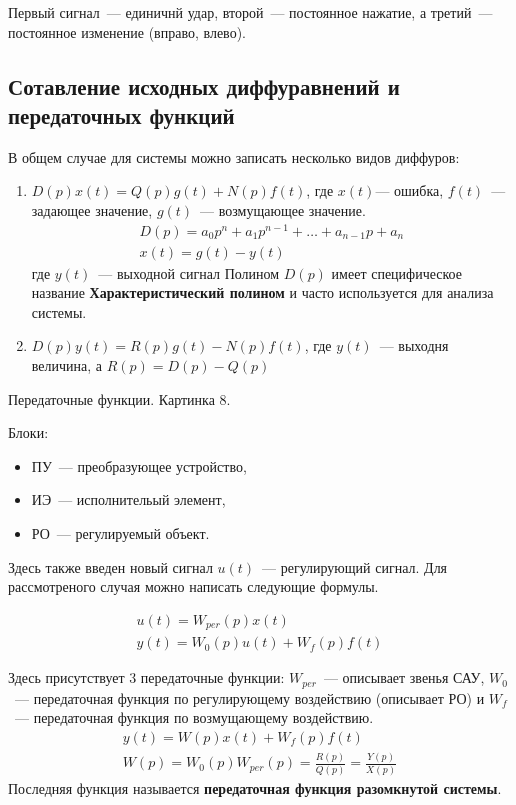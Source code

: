 Первый сигнал~--- единичнй удар, второй~--- постоянное нажатие, а третий~--- постоянное изменение (вправо, влево).

\subsection{Сотавление исходных диффуравнений и передаточных функций}
В общем случае для системы можно записать несколько видов диффуров:
\begin{enumerate}
	\item $D(p)x(t)=Q(p)g(t)+N(p)f(t)$, где $x(t)$--- ошибка, $f(t)$~--- задающее значение, $g(t)$~--- возмущающее значение.
	\begin{gather*}
		D(p)=a_0p^n+a_1p^{n-1}+\ldots+a_{n-1}p+a_n\\
		x(t)=g(t)-y(t)
	\end{gather*}
	где $y(t)$~--- выходной сигнал
	Полином $D(p)$ имеет специфическое название \textbf{Характеристический полином} и часто используется для анализа системы.
	\item $D(p)y(t)=R(p)g(t)-N(p)f(t)$, где $y(t)$~--- выходня величина, а $R(p)=D(p)-Q(p)$
\end{enumerate}

Передаточные функции. Картинка 8.

Блоки:
\begin{itemize}
	\item ПУ~--- преобразующее устройство,
	\item ИЭ~--- исполнительый элемент,
	\item РО~--- регулируемый объект.
\end{itemize}
Здесь также введен новый сигнал $u(t)$~--- регулирующий сигнал. Для рассмотреного случая можно написать следующие формулы.

\begin{gather*}
	u(t)=W_{per}(p)x(t)\\
	y(t)=W_0(p)u(t)+W_f(p)f(t)
\end{gather*}

Здесь присутствует 3 передаточные функции: $W_{per}$~--- описывает звенья САУ, $W_0$~--- передаточная функция по регулирующему воздействию (описывает РО) и $W_f$~--- передаточная функция по возмущающему воздействию.
\begin{gather*}
	y(t)=W(p)x(t)+W_f(p)f(t) \\
	W(p)=W_0(p)W_{per}(p)=\frac{R(p)}{Q(p)}=\frac{Y(p)}{X(p)}
\end{gather*}
Последняя функция называется \textbf{передаточная функция разомкнутой системы}.

